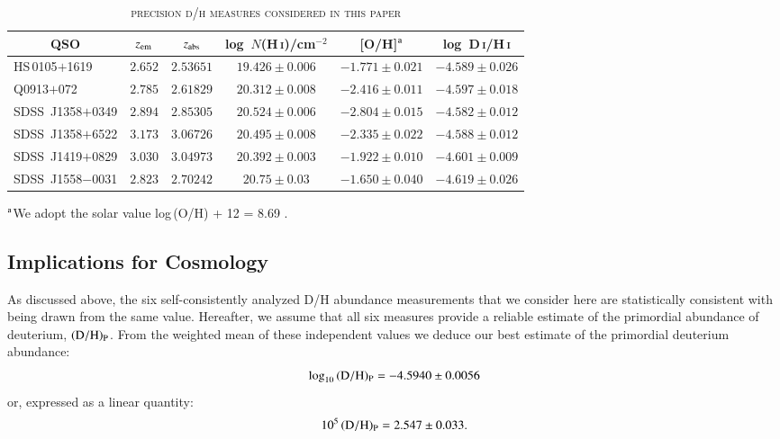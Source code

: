 \documentclass[12pt,preprint,useAMS,usenatbib]{emulateapj}
\newcommand{\DI}{\textrm{D}\,\textsc{i}}
\newcommand{\HI}{\textrm{H}\,\textsc{i}}
\begin{document}
\begin{table}
\begin{center}
    \caption{\textsc{precision d/h measures considered in this paper}}
    \hspace{-0.6cm}\begin{tabular}{@{}lccccc}
    \hline
   \multicolumn{1}{c}{QSO}
& \multicolumn{1}{c}{$z_{\rm em}$}
& \multicolumn{1}{c}{$z_{\rm abs}$}
& \multicolumn{1}{c}{log~$N$(\HI)/cm$^{-2}$}
& \multicolumn{1}{c}{[O/H]$^{\rm a}$}
& \multicolumn{1}{c}{log~\DI/\HI}\\
  \hline
HS\,0105$+$1619          &  $2.652$  &  $2.53651$  &  $19.426\pm0.006$  &  $-1.771\pm0.021$  &  $-4.589\pm0.026$  \\
Q0913$+$072                 &  $2.785$  &  $2.61829$  &  $20.312\pm0.008$  &  $-2.416\pm0.011$  &  $-4.597\pm0.018$  \\
SDSS~J1358$+$0349  &  $2.894$  &  $2.85305$  &  $20.524\pm0.006$   &  $-2.804\pm0.015$  &  $-4.582\pm0.012$  \\
SDSS~J1358$+$6522  &  $3.173$  &  $3.06726$  &  $20.495\pm0.008$   &  $-2.335\pm0.022$  &  $-4.588\pm0.012$  \\
SDSS~J1419$+$0829  &  $3.030$  &  $3.04973$  &  $20.392\pm0.003$   &  $-1.922\pm0.010$  &  $-4.601\pm0.009$  \\
SDSS~J1558$-$0031   &  $2.823$  &  $2.70242$  &  $20.75\pm0.03$        &  $-1.650\pm0.040$  &  $-4.619\pm0.026$  \\
  \hline
    \end{tabular}
    \label{tab:dhmeasures}

$^{\rm a}${We adopt the solar value log\,(O/H) + 12 = 8.69 \citep{Asp09}.}\\
\end{center}
\end{table}

\subsection{Implications for Cosmology}

As discussed above, the six self-consistently analyzed D/H
abundance measurements that we consider here are statistically
consistent with being drawn from the same value. Hereafter,
we assume that all six measures provide a reliable estimate
of the primordial abundance of deuterium, $({\rm D/H})_{\rm P}$.
From the weighted mean of these independent values we
deduce our best estimate of the primordial deuterium abundance:
\begin{equation}
\label{eqn:dhp}
\log_{10}\,({\rm D/H})_{\rm P} = -4.5940\pm0.0056
\end{equation}
or, expressed as a linear quantity:
\begin{equation}
10^{5}\,({\rm D/H})_{\rm P} = 2.547\pm0.033.
\end{equation}
\end{document}
